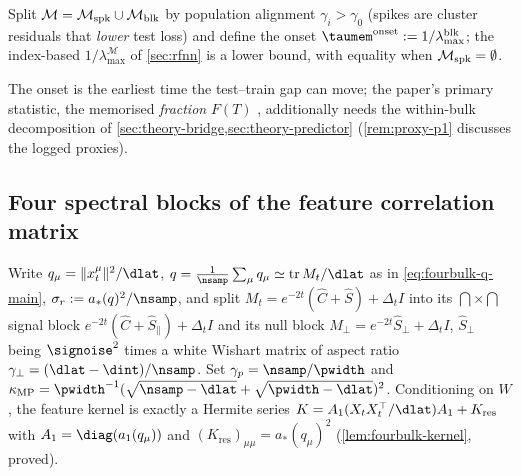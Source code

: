 \begin{definition}\label{def:taumem-main}
Split $\mathcal M=\mathcal M_{\rm spk}\cup\mathcal M_{\rm blk}$ by population alignment $\gamma_i>\gamma_0$ (spikes are cluster residuals that \emph{lower} test loss) and define the onset $\taumem^{\rm onset}:=1/\lambda^{\rm blk}_{\max}$; the index-based $1/\lambda^{\mathcal M}_{\max}$ of \cref{sec:rfnn} is a lower bound, with equality when $\mathcal M_{\rm spk}=\emptyset$.
\end{definition}
The onset is the earliest time the test--train gap can move; the paper's primary statistic, the memorised \emph{fraction} $F(T)$ \citep{somepalli2023diffusion,bonnaire2025}, additionally needs the within-bulk decomposition of \cref{sec:theory-bridge,sec:theory-predictor} (\cref{rem:proxy-p1} discusses the logged proxies).

\subsection{Four spectral blocks of the feature correlation matrix}
\label{sec:theory-fourbulk}\label{sec:theory-edges}

Write $q_\mu=\|x_t^\mu\|^2/\dlat$, $q=\tfrac1\nsamp\sum_\mu q_\mu\simeq\operatorname{tr}M_t/\dlat$ as in \eqref{eq:fourbulk-q-main}, $\sigma_r:=a_*(q)^2/\nsamp$, and split $M_t=e^{-2t}(\hat C+\hat S)+\Delta_tI$ into its $\dint\times\dint$ signal block $e^{-2t}(\hat C+\hat S_\parallel)+\Delta_tI$ and its null block $M_\perp=e^{-2t}\hat S_\perp+\Delta_tI$, $\hat S_\perp$ being $\signoise^2$ times a white Wishart matrix of aspect ratio $\gamma_\perp=(\dlat-\dint)/\nsamp$. Set $\gamma_p=\nsamp/\pwidth$ and $\kappa_{\mathrm{MP}}=\pwidth^{-1}(\sqrt{\nsamp-\dlat}+\sqrt{\pwidth-\dlat})^2$. Conditioning on $W$, the feature kernel is exactly a Hermite series $K=A_1(X_tX_t^{\top}/\dlat)A_1+K_{\mathrm{res}}$ with $A_1=\diag(a_1(q_\mu))$ and $(K_{\mathrm{res}})_{\mu\mu}=a_*(q_\mu)^2$ (\cref{lem:fourbulk-kernel}, proved).

